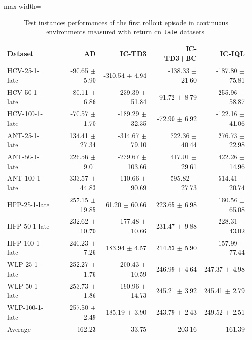 \documentclass{article}
\begin{document}
\begin{table}[ht]
    \label{tab:}
    \begin{center}
    \caption{Test instances performances of the first rollout episode in continuous environments measured with return on \texttt{late} datasets.}
    \begin{small}
    \begin{adjustbox}{max width=\columnwidth}
		\begin{tabular}{l|rrrr}
		\toprule
	\textbf{Dataset} & \textbf{AD} & \textbf{IC-TD3} & \textbf{IC-TD3+BC} & \textbf{IC-IQL}\\
\midrule
HCV-25-1-late & -90.65 $\pm$ 5.90 & -310.54 $\pm$ 4.94 & -138.33 $\pm$ 21.60 & -187.80 $\pm$ 75.81\\
HCV-50-1-late & -80.11 $\pm$ 6.86 & -239.39 $\pm$ 51.84 & -91.72 $\pm$ 8.79 & -255.96 $\pm$ 58.87\\
HCV-100-1-late & -70.57 $\pm$ 1.70 & -189.29 $\pm$ 32.35 & -72.90 $\pm$ 6.92 & -122.16 $\pm$ 41.06\\
ANT-25-1-late & 134.41 $\pm$ 27.34 & -314.67 $\pm$ 79.10 & 322.36 $\pm$ 40.44 & 276.73 $\pm$ 22.98\\
ANT-50-1-late & 226.56 $\pm$ 9.01 & -239.67 $\pm$ 103.66 & 417.01 $\pm$ 29.61 & 422.26 $\pm$ 14.96\\
ANT-100-1-late & 333.57 $\pm$ 44.83 & -110.66 $\pm$ 90.69 & 595.82 $\pm$ 27.73 & 514.41 $\pm$ 20.74\\
HPP-25-1-late & 257.15 $\pm$ 19.85 & 61.20 $\pm$ 60.66 & 223.65 $\pm$ 6.98 & 160.56 $\pm$ 65.08\\
HPP-50-1-late & 232.62 $\pm$ 10.70 & 177.48 $\pm$ 10.66 & 231.47 $\pm$ 9.88 & 228.31 $\pm$ 43.02\\
HPP-100-1-late & 240.23 $\pm$ 7.26 & 183.94 $\pm$ 4.57 & 214.53 $\pm$ 5.90 & 157.99 $\pm$ 77.44\\
WLP-25-1-late & 252.27 $\pm$ 1.76 & 200.43 $\pm$ 10.59 & 246.99 $\pm$ 4.64 & 247.37 $\pm$ 4.98\\
WLP-50-1-late & 253.73 $\pm$ 1.86 & 190.96 $\pm$ 14.73 & 245.21 $\pm$ 3.92 & 245.41 $\pm$ 2.79\\
WLP-100-1-late & 257.50 $\pm$ 2.49 & 185.19 $\pm$ 3.90 & 243.79 $\pm$ 2.43 & 249.52 $\pm$ 2.51\\
\midrule
Average & 162.23 & -33.75 & 203.16 & 161.39\\
\end{tabular}
        \end{adjustbox}
    \end{small}
    \end{center}
    \vskip -0.1in
\end{table}
\end{document}
